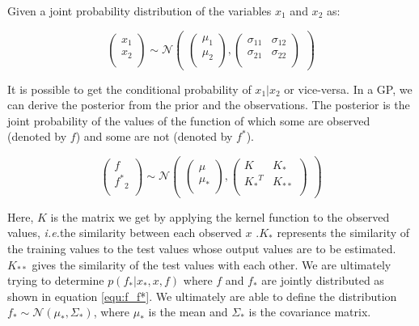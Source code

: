 \documentclass[12pt]{report}
\newcommand{\ie}{\textit{i.e.}}
\begin{document}
Given a joint probability distribution of the variables $x_1$ and $x_2$ as:

\begin{equation}
\begin{pmatrix}x_1\\
x_2\\
\end{pmatrix} 
\sim \mathcal{N}\begin{pmatrix} 
\begin{pmatrix}\mu_1\\
\mu_2\\
\end{pmatrix} ,\begin{pmatrix}\sigma_{11} & \sigma_{12}\\
\sigma_{21} & \sigma_{22}\\
\end{pmatrix} 
\end{pmatrix}
\end{equation}

It is possible to get the conditional probability of $x_1 | x_2$ or vice-versa. In a GP, we can derive the posterior from the prior and the observations. The posterior is the joint probability of the values of the function of which some are observed (denoted by $f$) and some are not (denoted by $f^*$). 

\begin{equation}
\label{equ:f_f*}
\begin{pmatrix}f\\
{f^*}_2\\
\end{pmatrix} 
\sim \mathcal{N}\begin{pmatrix} 
\begin{pmatrix}\mu\\
\mu_*\\
\end{pmatrix} ,\begin{pmatrix}K & K_*\\
{K_*}^T & K_{**}\\
\end{pmatrix} 
\end{pmatrix}
\end{equation}

Here, $K$ is the matrix we get by applying the kernel function to the observed values, \ie the similarity between each observed $x$ .$K_*$ represents the similarity of the training values to the test values whose output values are to be estimated. $K_{**}$ gives the similarity of the test values with each other. We are ultimately trying to determine $p(f_*|x_*,x,f)$ where $f$ and $f_*$ are jointly distributed as shown in equation \ref{equ:f_f*}. We ultimately are able to define the distribution $f_* \sim \mathcal{N} (\mu_*,\Sigma_*)$, where $\mu_*$ is the mean and $\Sigma_*$ is the covariance matrix.
\end{document}
